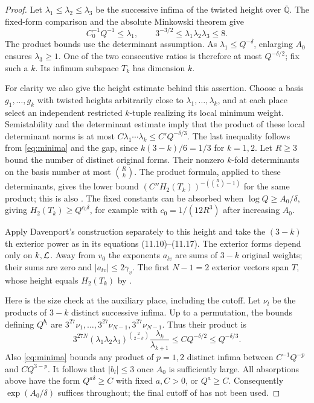 \documentclass[11pt]{article}
\numberwithin{equation}{section}
\theoremstyle{remark}\newtheorem{remark}[theorem]{Remark}
\newcommand{\Qbar}{\overline{\mathbb Q}}
\begin{document}
\begin{proof}
Let $\lambda_1\le\lambda_2\le\lambda_3$ be the successive infima of the
twisted height over $\Qbar$. The fixed-form comparison and the absolute
Minkowski theorem \cite[Lemma~7.1 and Proposition~9.2]{EF13} give
\begin{equation}\label{eq:minima}
 C_0^{-1}Q^{-1}\le\lambda_1,\qquad
 3^{-3/2}\le\lambda_1\lambda_2\lambda_3\le8.
\end{equation}
The product bounds use the determinant assumption. As
$\lambda_1\le Q^{-\delta}$, enlarging $A_0$ ensures $\lambda_3\ge1$.
One of the two consecutive ratios is therefore at most $Q^{-\delta/2}$;
fix such a $k$. Its infimum subspace $T_k$ has dimension $k$.

For clarity we also give the height estimate behind this assertion.
Choose a basis $g_1,\ldots,g_k$ with twisted heights arbitrarily close
to $\lambda_1,\ldots,\lambda_k$, and at each place select an independent
restricted $k$-tuple realizing its local minimum weight.
Semistability and the determinant estimate imply that the product of
these local determinant norms is at most
$C\lambda_1\cdots\lambda_k\le C'Q^{-\delta/3}$.
The last inequality follows from \eqref{eq:minima} and the gap, since
$k(3-k)/6=1/3$ for $k=1,2$.
Let $R\ge3$ bound the number of distinct original forms. Their nonzero
$k$-fold determinants on the basis number at most $\binom Rk$.
The product formula, applied to these determinants, gives the lower
bound $(C''H_2(T_k))^{-(\binom Rk-1)}$ for the same product; this is
also \cite[Lemma~10.2]{EF13}. The fixed constants can be absorbed when
$\log Q\ge A_0/\delta$, giving
$H_2(T_k)\ge Q^{c_0\delta}$, for example with
$c_0=1/(12R^3)$ after increasing $A_0$.

Apply Davenport's construction \cite[Lemma~11.3]{EF13} separately to
this height and take the $(3-k)$th exterior power as in its
equations (11.10)--(11.17). The exterior forms depend only on $k,\mathcal L$.
Away from $v_0$ the exponents $a_{lv}$ are sums of $3-k$ original weights;
their sums are zero and $|a_{lv}|\le2\gamma_v$.
The first $N-1=2$ exterior vectors span $T$, whose height equals
$H_2(T_k)$ by \cite[Lemma~6.1]{EF13}.

Here is the size check at the auxiliary place, including the cutoff.
Let $\nu_l$ be the products of $3-k$ distinct successive infima.
Up to a permutation, the bounds defining $Q^{b_l}$ are
$3^{27}\nu_1,\ldots,3^{27}\nu_{N-1},3^{27}\nu_{N-1}$.
Thus their product is
\[
 3^{27N}(\lambda_1\lambda_2\lambda_3)^{\binom2{2-k}}
       \frac{\lambda_k}{\lambda_{k+1}}
 \le C Q^{-\delta/2}\le Q^{-\delta/3}.
\]
Also \eqref{eq:minima} bounds any product of $p=1,2$ distinct infima
between $C^{-1}Q^{-p}$ and $C Q^{3-p}$. It follows that $|b_l|\le3$
once $A_0$ is sufficiently large. All absorptions above have the form
$Q^{a\delta}\ge C$ with fixed $a,C>0$, or $Q^a\ge C$.
Consequently $\exp(A_0/\delta)$ suffices throughout; the final cutoff
of \cite[Theorem~8.1]{EF13} has not been used.
\end{proof}
\end{document}
